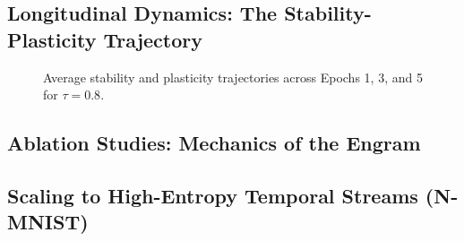 \documentclass[5p,times]{elsarticle}
\begin{document}
\subsection{Longitudinal Dynamics: The Stability-Plasticity Trajectory}

\begin{figure}[H]
    \caption{Average stability and plasticity trajectories across Epochs 1, 3, and 5 for $\tau=0.8$.}
    \label{fig:longitudinal_trajectory}
\end{figure}

\subsection{Ablation Studies: Mechanics of the Engram}

\begin{table}[H]
    \caption{Ablation Study: Forward Pass Scaling and Reset Mechanics (Split-MNIST, Epoch 3)}
    \begin{center}
    \label{tab:ablations}
    \end{center}
\end{table}

\subsection{Scaling to High-Entropy Temporal Streams (N-MNIST)}
\end{document}
